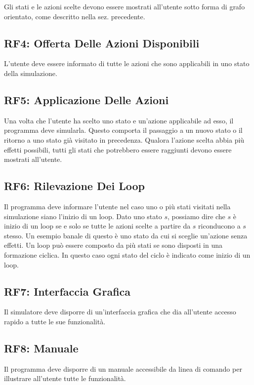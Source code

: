 \documentclass[a4paper, 11pt, titlepage, twoside, openany]{book}
\begin{document}
Gli stati e le azioni scelte devono essere mostrati all'utente sotto forma di grafo orientato, come descritto nella sez. precedente.

\subsection{RF4: Offerta Delle Azioni Disponibili}
L'utente deve essere informato di tutte le azioni che sono applicabili in uno stato della simulazione.

\subsection{RF5: Applicazione Delle Azioni}
Una volta che l'utente ha scelto uno stato e un'azione applicabile ad esso, il programma deve simularla. Questo comporta il passaggio a un nuovo stato o il ritorno a uno stato già visitato in precedenza.
Qualora l'azione scelta abbia più effetti possibili, tutti gli stati che potrebbero essere raggiunti devono essere mostrati all'utente.

\subsection{RF6: Rilevazione Dei Loop}
\label{rf6: rilevazione_loop}
Il programma deve informare l'utente nel caso uno o più stati visitati nella simulazione siano l'inizio di un loop.
Dato uno stato $s$, possiamo dire che $s$ è inizio di un loop se e solo se tutte le azioni scelte a partire da $s$ riconducono a $s$ stesso.
Un esempio banale di questo è uno stato da cui si sceglie un'azione senza effetti.
Un loop può essere composto da più stati se sono disposti in una formazione ciclica. In questo caso ogni stato del ciclo è 
indicato come inizio di un loop.

\subsection{RF7: Interfaccia Grafica}
Il simulatore deve disporre di un'interfaccia grafica che dia all'utente accesso rapido a tutte le sue funzionalità.

\subsection{RF8: Manuale}
\label{subsub: manuale}
Il programma deve disporre di un manuale accessibile da linea di comando per illustrare all'utente tutte le funzionalità.
\end{document}
